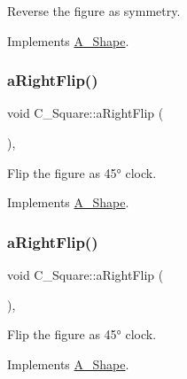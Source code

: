 Reverse the figure as symmetry. 



Implements \hyperlink{classA__Shape_afe2c7969d647f6358da13879a7534ecb}{A\+\_\+\+Shape}.

\mbox{\label{classC__Square_a0ea2df0d283ee4ffa911163e55a0a637}} 
\subsubsection{\texorpdfstring{a\+Right\+Flip()}{aRightFlip()}\hspace{0.1cm}{\footnotesize\ttfamily [1/2]}}
{\footnotesize\ttfamily void C\+\_\+\+Square\+::a\+Right\+Flip (\begin{DoxyParamCaption}{ }\end{DoxyParamCaption})\hspace{0.3cm}{\ttfamily [override]}, {\ttfamily [virtual]}}



Flip the figure as 45° clock. 



Implements \hyperlink{classA__Shape_a892688cbbad3297e00e87cce0dbfc76d}{A\+\_\+\+Shape}.

\mbox{\label{classC__Square_a0ea2df0d283ee4ffa911163e55a0a637}} 
\subsubsection{\texorpdfstring{a\+Right\+Flip()}{aRightFlip()}\hspace{0.1cm}{\footnotesize\ttfamily [2/2]}}
{\footnotesize\ttfamily void C\+\_\+\+Square\+::a\+Right\+Flip (\begin{DoxyParamCaption}{ }\end{DoxyParamCaption})\hspace{0.3cm}{\ttfamily [override]}, {\ttfamily [virtual]}}



Flip the figure as 45° clock. 



Implements \hyperlink{classA__Shape_a892688cbbad3297e00e87cce0dbfc76d}{A\+\_\+\+Shape}.

